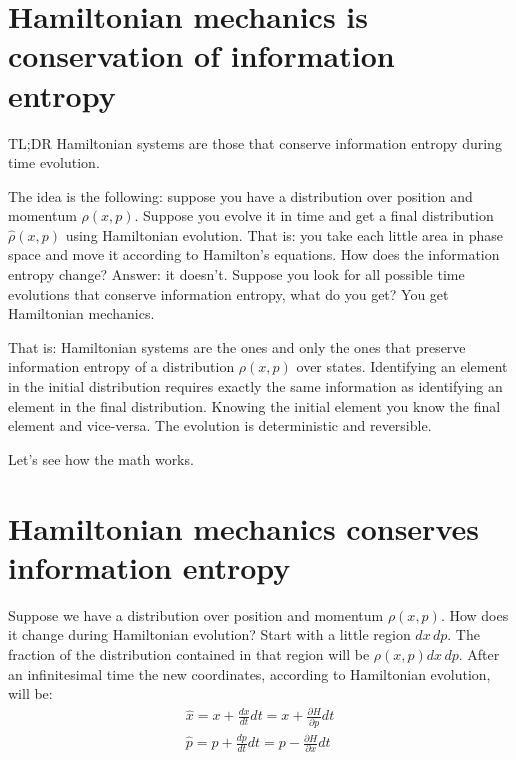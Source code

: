 \documentclass[aps,pra,10pt,floatfix,nofootinbib]{revtex4-1}
\theoremstyle{definition}
\begin{document}
	
\section{Hamiltonian mechanics is conservation of information entropy}

TL;DR Hamiltonian systems are those that conserve information entropy during time evolution.

The idea is the following: suppose you have a distribution over position and momentum $\rho(x, p)$. Suppose you evolve it in time and get a final distribution $\hat{\rho}(x, p)$ using Hamiltonian evolution. That is: you take each little area in phase space and move it according to Hamilton's equations. How does the information entropy change? Answer: it doesn't. Suppose you look for all possible time evolutions that conserve information entropy, what do you get? You get Hamiltonian mechanics.

That is: Hamiltonian systems are the ones and only the ones that preserve information entropy of a distribution $\rho(x, p)$ over states. Identifying an element in the initial distribution requires exactly the same information as identifying an element in the final distribution. Knowing the initial element you know the final element and vice-versa. The evolution is deterministic and reversible.

Let's see how the math works.

\section{Hamiltonian mechanics conserves information entropy}

Suppose we have a distribution over position and momentum $\rho(x, p)$. How does it change during Hamiltonian evolution? Start with a little region $dx \,dp$. The fraction of the distribution contained in that region will be $\rho(x, p) dx \,dp$. After an infinitesimal time the new coordinates, according to Hamiltonian evolution, will be:
\begin{equation}
\begin{aligned}
\hat{x} = x + \frac{dx}{dt} dt = x + \frac{\partial H}{\partial p} dt  \\
\hat{p} = p + \frac{dp}{dt} dt = p - \frac{\partial H}{\partial x} dt  \\
\end{aligned}
\label{newCoordinates}
\end{equation}
\end{document}
